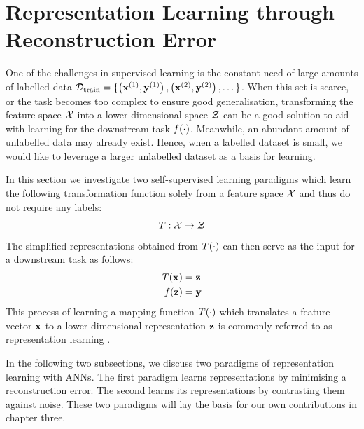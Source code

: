 		
		
		
		
		
		
		


\section{Representation Learning through Reconstruction Error} \label{cha:bg_reconstr}




One of the challenges in supervised learning is the constant need of large amounts of labelled data $\mathcal{D}_{\text{train}} = \{ \left( \mathbf{x}^{(1)}, \mathbf{y}^{(1)} \right), \left( \mathbf{x}^{(2)}, \mathbf{y}^{(2)} \right), \dots \}$. When this set is scarce, or the task becomes too complex to ensure good generalisation, transforming the feature space $\mathcal{X}$ into a lower-dimensional space $\mathcal{Z}$ can be a good solution to aid with learning for the downstream task $f(\cdot)$. Meanwhile, an abundant amount of unlabelled data may already exist. Hence, when a labelled dataset is small, we would like to leverage a larger unlabelled dataset as a basis for learning.

In this section we investigate two self-supervised learning paradigms which learn the following transformation function solely from a feature space $\mathcal{X}$ and thus do not require any labels:
$$T: \mathcal{X} \rightarrow \mathcal{Z}$$
The simplified representations obtained from $T(\cdot)$ can then serve as the input for a downstream task as follows:
\begin{align*}
	T(\mathbf{x}) &=  \mathbf{z} \\
	f(\mathbf{z}) &= \mathbf{y} 
\end{align*}
This process of learning a mapping function $T(\cdot)$ which translates a feature vector $\mathbf{x}$ to a lower-dimensional representation $\mathbf{z}$ is commonly referred to as representation learning \citep{le-khacContrastiveRepresentationLearning2020}. 

In the following two subsections, we discuss two paradigms of representation learning with ANNs. The first paradigm learns representations by minimising a reconstruction error. The second learns its representations by contrasting them against noise. These two paradigms will lay the basis for our own contributions in chapter three.

